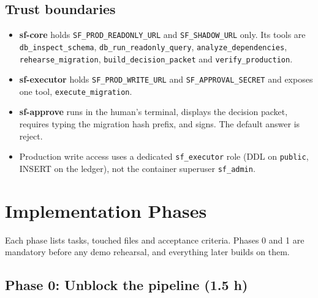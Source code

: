 \documentclass[11pt,a4paper]{article}
\newcommand{\fp}[1]{\nolinkurl{#1}}  %
\begin{document}
\begin{center}
\end{center}

\subsection{Trust boundaries}
\begin{itemize}[leftmargin=*]
  \item \textbf{sf-core} holds \fp{SF_PROD_READONLY_URL} and \fp{SF_SHADOW_URL} only. Its tools are
        \fp{db_inspect_schema}, \fp{db_run_readonly_query}, \fp{analyze_dependencies},
        \fp{rehearse_migration}, \fp{build_decision_packet} and \fp{verify_production}.
  \item \textbf{sf-executor} holds \fp{SF_PROD_WRITE_URL} and \fp{SF_APPROVAL_SECRET}
        and exposes one tool, \fp{execute_migration}.
  \item \textbf{sf-approve} runs in the human's terminal, displays the decision packet,
        requires typing the migration hash prefix, and signs. The default answer is reject.
  \item Production write access uses a dedicated \fp{sf_executor} role (DDL on
        \fp{public}, INSERT on the ledger), not the container superuser \fp{sf_admin}.
\end{itemize}

\section{Implementation Phases}

Each phase lists tasks, touched files and acceptance criteria. Phases 0 and 1 are
mandatory before any demo rehearsal, and everything later builds on them.

\subsection{Phase 0: Unblock the pipeline (1.5 h)}
\label{sec:p0}
\end{document}
